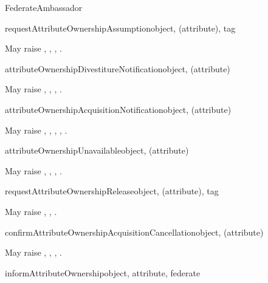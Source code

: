 \begin{classdesc}{FederateAmbassador}{}
\medskip
{}

\begin{methoddesc}{requestAttributeOwnershipAssumption}{object, (attribute), tag}

May raise
,
,
,
.
\end{methoddesc}

\begin{methoddesc}{attributeOwnershipDivestitureNotification}{object, (attribute)}

May raise
,
,
,
.
\end{methoddesc}

\begin{methoddesc}{attributeOwnershipAcquisitionNotification}{object, (attribute)}

May raise
,
,
,
,
.
\end{methoddesc}

\begin{methoddesc}{attributeOwnershipUnavailable}{object, (attribute)}

May raise
,
,
,
.
\end{methoddesc}

\begin{methoddesc}{requestAttributeOwnershipRelease}{object, (attribute), tag}

May raise
,
,
.
\end{methoddesc}

\begin{methoddesc}{confirmAttributeOwnershipAcquisitionCancellation}{object, (attribute)}

May raise
,
,
,
.
\end{methoddesc}

\begin{methoddesc}{informAttributeOwnership}{object, attribute, federate}


\end{methoddesc}
\end{classdesc}
